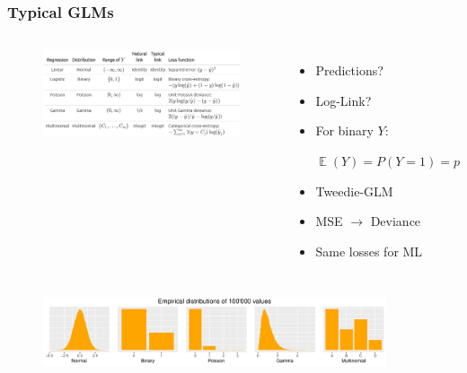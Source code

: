 \documentclass[
    utf8,
    aspectratio=169
]{beamer}  %
\DeclareMathOperator{\E}{\mathbb{E}}  %
\begin{document}
\begin{frame}
	\frametitle{Typical GLMs}
	\begin{columns}[onlytextwidth]
		\begin{footnotesize}
			\begin{figure}
				\includegraphics[width=1\textwidth]{pics/glm.png}
			\end{figure}
		\end{footnotesize}
		\begin{itemize}
			\item Predictions?
			\item Log-Link?
			\item For binary $Y$:
			
			$\E(Y) = P(Y = 1) = p$
			\item Tweedie-GLM
			\item MSE $\rightarrow$ Deviance
			\item Same losses for ML
		\end{itemize}
\end{columns}
	\begin{figure}
		\includegraphics[width=0.9\textwidth]{pics/GLM_distributions.pdf}
	\end{figure}
\end{frame}
\end{document}
